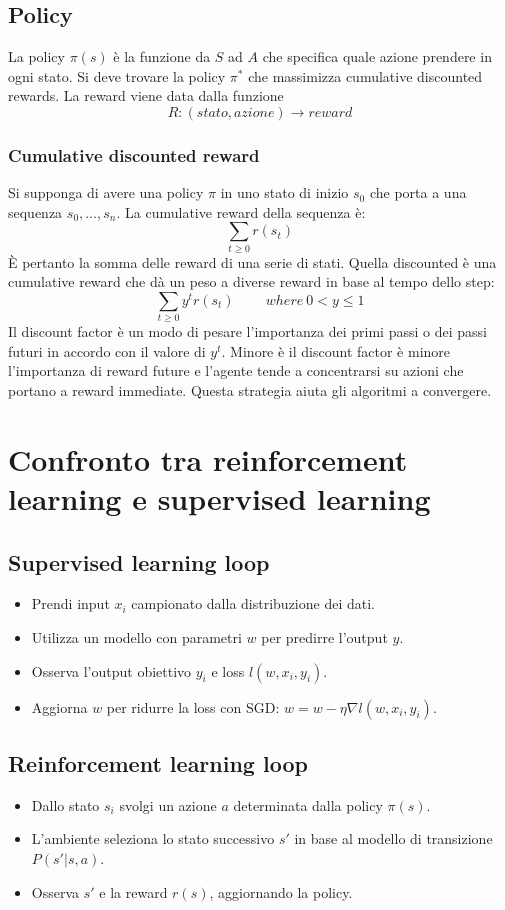 	\subsection{Policy}
	La policy $\pi(s)$ \`e la funzione da $S$ ad $A$ che specifica quale azione prendere in ogni stato.
	Si deve trovare la policy $\pi^*$ che massimizza cumulative discounted rewards.
	La reward viene data dalla funzione
	$$R:(stato, azione)\rightarrow reward$$

		\subsubsection{Cumulative discounted reward}
		Si supponga di avere una policy $\pi$ in uno stato di inizio $s_0$ che porta a una sequenza $s_0,\dots, s_n$.
		La cumulative reward della sequenza \`e:
		$$\sum\limits_{t\ge 0} r(s_t)$$
		\`E pertanto la somma delle reward di una serie di stati.
		Quella discounted \`e una cumulative reward che d\`a un peso a diverse reward in base al tempo dello step:
		$$\sum\limits_{t\ge 0} y^tr(s_t)\qquad\ where\ 0 < y\le 1$$
		Il discount factor \`e un modo di pesare l'importanza dei primi passi o dei passi futuri in accordo con il valore di $y^t$.
		Minore \`e il discount factor \`e minore l'importanza di reward future e l'agente tende a concentrarsi su azioni che portano a reward immediate.
		Questa strategia aiuta gli algoritmi a convergere.

\section{Confronto tra reinforcement learning e supervised learning}

	\subsection{Supervised learning loop}
	\begin{itemize}
		\item Prendi input $x_i$ campionato dalla distribuzione dei dati.
		\item Utilizza un modello con parametri $w$ per predirre l'output $y$.
		\item Osserva l'output obiettivo $y_i$ e loss $l(w, x_i, y_i)$.
		\item Aggiorna $w$ per ridurre la loss con SGD: $w = w -\eta\nabla l(w, x_i, y_i)$.
	\end{itemize}
	
	\subsection{Reinforcement learning loop}
	\begin{itemize}
		\item Dallo stato $s_i$ svolgi un azione $a$ determinata dalla policy $\pi(s)$.
		\item L'ambiente seleziona lo stato successivo $s'$ in base al modello di transizione $P(s'|s,a)$.
		\item Osserva $s'$ e la reward $r(s)$, aggiornando la policy.
	\end{itemize}
	
